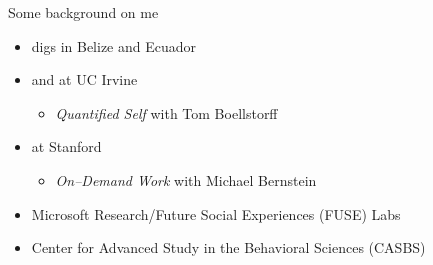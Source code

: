 \documentclass[presentation]{subfiles}
\begin{document}
  \begin{frame}{Some background on me}

  \begin{itemize}
    \item {} digs in Belize and Ecuador
    \item {} and  at UC Irvine
    \begin{itemize}
      \item \emph{Quantified Self} with \alert{Tom Boellstorff}
    \end{itemize}
    \item {} at Stanford
    \begin{itemize}
      \item \emph{On--Demand Work} with \alert{Michael Bernstein}
    \end{itemize}
    \item Microsoft Research/Future Social Experiences ({FUSE}) Labs
    \item Center for Advanced Study in the Behavioral Sciences ({CASBS})
  \end{itemize}
  \end{frame}
\end{document}
